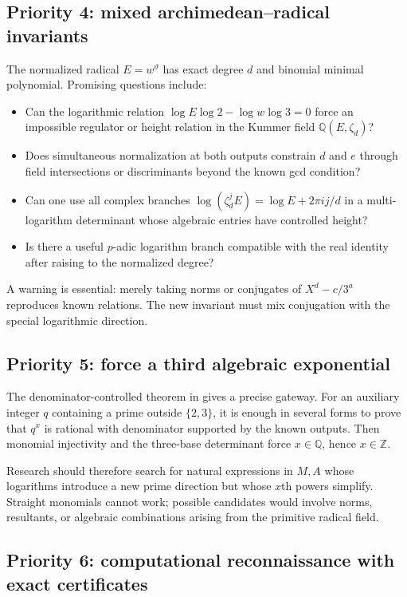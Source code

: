 \documentclass[11pt,oneside]{article}
\theoremstyle{definition}
\theoremstyle{remark}
\newcommand{\Z}{\mathbb Z}
\newcommand{\Q}{\mathbb Q}
\newcommand{\thetaq}{\vartheta}
\begin{document}
\subsection{Priority 4: mixed archimedean--radical invariants}

The normalized radical $E=w^{\thetaq}$ has exact degree $d$ and binomial minimal polynomial.
Promising questions include:

\begin{itemize}
\item Can the logarithmic relation
$\log E\log2-\log w\log3=0$ force an impossible regulator or height relation in the Kummer
field $\Q(E,\zeta_d)$?
\item Does simultaneous normalization at both outputs constrain $d$ and $e$ through field
intersections or discriminants beyond the known gcd condition?
\item Can one use all complex branches
$\log(\zeta_d^jE)=\log E+2\pi i j/d$ in a multi-logarithm determinant whose algebraic entries
have controlled height?
\item Is there a useful $p$-adic logarithm branch compatible with the real identity after
raising to the normalized degree?
\end{itemize}

A warning is essential: merely taking norms or conjugates of $X^d-c/3^a$ reproduces known
relations.  The new invariant must mix conjugation with the special logarithmic direction.

\subsection{Priority 5: force a third algebraic exponential}

The denominator-controlled theorem in  gives a precise gateway.
For an auxiliary integer $q$ containing a prime outside $\{2,3\}$, it is enough in several
forms to prove that $q^x$ is rational with denominator supported by the known outputs.  Then
monomial injectivity and the three-base determinant force $x\in\Q$, hence $x\in\Z$.

Research should therefore search for natural expressions in $M,A$ whose logarithms introduce
a new prime direction but whose $x$th powers simplify.  Straight monomials cannot work;
possible candidates would involve norms, resultants, or algebraic combinations arising from
the primitive radical field.

\subsection{Priority 6: computational reconnaissance with exact certificates}
\end{document}
